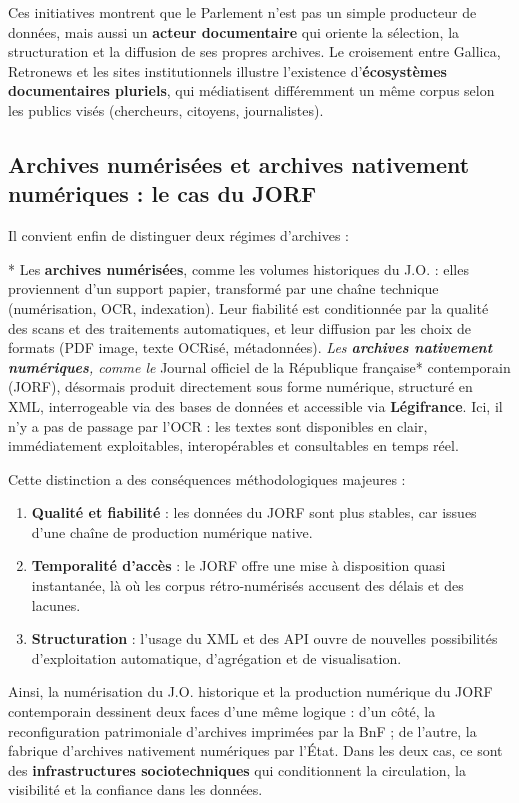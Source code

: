 Ces initiatives montrent que le Parlement n’est pas un simple producteur de données, mais aussi un \textbf{acteur documentaire} qui oriente la sélection, la structuration et la diffusion de ses propres archives. Le croisement entre Gallica, Retronews et les sites institutionnels illustre l’existence d’\textbf{écosystèmes documentaires pluriels}, qui médiatisent différemment un même corpus selon les publics visés (chercheurs, citoyens, journalistes).

\subsection{Archives numérisées et archives nativement numériques : le cas du JORF}

Il convient enfin de distinguer deux régimes d’archives :

* Les \textbf{archives numérisées}, comme les volumes historiques du J.O. : elles proviennent d’un support papier, transformé par une chaîne technique (numérisation, OCR, indexation). Leur fiabilité est conditionnée par la qualité des scans et des traitements automatiques, et leur diffusion par les choix de formats (PDF image, texte OCRisé, métadonnées).
\emph{ Les \textbf{archives nativement numériques}, comme le }Journal officiel de la République française* contemporain (JORF), désormais produit directement sous forme numérique, structuré en XML, interrogeable via des bases de données et accessible via \textbf{Légifrance}. Ici, il n’y a pas de passage par l’OCR : les textes sont disponibles en clair, immédiatement exploitables, interopérables et consultables en temps réel.

Cette distinction a des conséquences méthodologiques majeures :

\begin{enumerate}
\item \textbf{Qualité et fiabilité} : les données du JORF sont plus stables, car issues d’une chaîne de production numérique native.
\item \textbf{Temporalité d’accès} : le JORF offre une mise à disposition quasi instantanée, là où les corpus rétro-numérisés accusent des délais et des lacunes.
\item \textbf{Structuration} : l’usage du XML et des API ouvre de nouvelles possibilités d’exploitation automatique, d’agrégation et de visualisation.
\end{enumerate}

Ainsi, la numérisation du J.O. historique et la production numérique du JORF contemporain dessinent deux faces d’une même logique : d’un côté, la reconfiguration patrimoniale d’archives imprimées par la BnF ; de l’autre, la fabrique d’archives nativement numériques par l’État. Dans les deux cas, ce sont des \textbf{infrastructures sociotechniques} qui conditionnent la circulation, la visibilité et la confiance dans les données.

